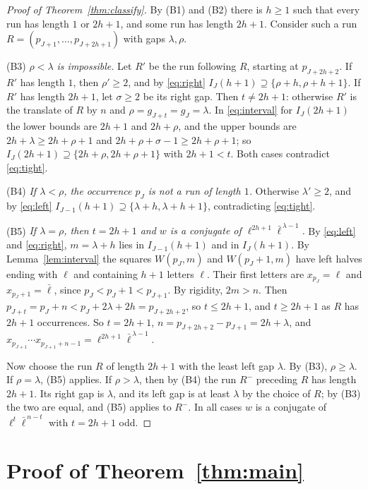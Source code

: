 \documentclass[11pt,reqno]{amsart}
\theoremstyle{definition}
\newcommand{\lb}{\bar\ell}
\begin{document}
\begin{proof}[Proof of Theorem~\ref{thm:classify}]
By (B1) and (B2) there is $h\ge 1$ such that every run has length $1$ or $2h+1$, and some run has length $2h+1$. Consider such a run $R=(p_{J+1},\dots,p_{J+2h+1})$ with gaps $\lambda,\rho$.

(B3) \emph{$\rho<\lambda$ is impossible.} Let $R'$ be the run following $R$, starting at $p_{J+2h+2}$. If $R'$ has length $1$, then $\rho'\ge 2$, and by \eqref{eq:right} $I_J(h+1)\supseteq\{\rho+h,\rho+h+1\}$. If $R'$ has length $2h+1$, let $\sigma\ge 2$ be its right gap. Then $t\neq 2h+1$: otherwise $R'$ is the translate of $R$ by $n$ and $\rho=g_{J+t}=g_J=\lambda$. In \eqref{eq:interval} for $I_J(2h+1)$ the lower bounds are $2h+1$ and $2h+\rho$, and the upper bounds are $2h+\lambda\ge 2h+\rho+1$ and $2h+\rho+\sigma-1\ge 2h+\rho+1$; so $I_J(2h+1)\supseteq\{2h+\rho,2h+\rho+1\}$ with $2h+1<t$. Both cases contradict \eqref{eq:tight}.

(B4) \emph{If $\lambda<\rho$, the occurrence $p_J$ is not a run of length $1$.} Otherwise $\lambda'\ge 2$, and by \eqref{eq:left} $I_{J-1}(h+1)\supseteq\{\lambda+h,\lambda+h+1\}$, contradicting \eqref{eq:tight}.

(B5) \emph{If $\lambda=\rho$, then $t=2h+1$ and $w$ is a conjugate of $\ell^{2h+1}\lb^{\,\lambda-1}$.} By \eqref{eq:left} and \eqref{eq:right}, $m=\lambda+h$ lies in $I_{J-1}(h+1)$ and in $I_J(h+1)$. By Lemma~\ref{lem:interval} the squares $W(p_J,m)$ and $W(p_J+1,m)$ have left halves ending with $\ell$ and containing $h+1$ letters $\ell$. Their first letters are $x_{p_J}=\ell$ and $x_{p_J+1}=\lb$, since $p_J<p_J+1<p_{J+1}$. By rigidity, $2m>n$. Then $p_{J+t}=p_J+n<p_J+2\lambda+2h=p_{J+2h+2}$, so $t\le 2h+1$, and $t\ge 2h+1$ as $R$ has $2h+1$ occurrences. So $t=2h+1$, $n=p_{J+2h+2}-p_{J+1}=2h+\lambda$, and $x_{p_{J+1}}\cdots x_{p_{J+1}+n-1}=\ell^{2h+1}\lb^{\,\lambda-1}$.

Now choose the run $R$ of length $2h+1$ with the least left gap $\lambda$. By (B3), $\rho\ge\lambda$. If $\rho=\lambda$, (B5) applies. If $\rho>\lambda$, then by (B4) the run $R^-$ preceding $R$ has length $2h+1$. Its right gap is $\lambda$, and its left gap is at least $\lambda$ by the choice of $R$; by (B3) the two are equal, and (B5) applies to $R^-$. In all cases $w$ is a conjugate of $\ell^{t}\lb^{\,n-t}$ with $t=2h+1$ odd.
\end{proof}

\section{Proof of Theorem~\ref{thm:main}}\label{sec:proof}
\end{document}
